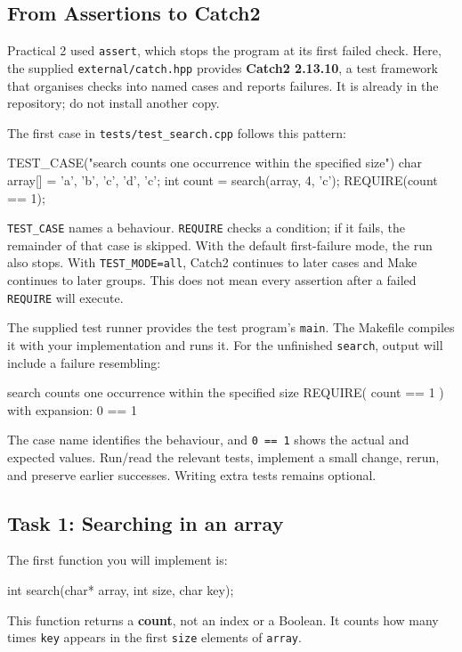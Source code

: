 \documentclass{csc2059practical}
\begin{document}
\subsection{From Assertions to Catch2}

Practical 2 used \texttt{assert}, which stops the program at its first failed check. Here, the supplied \texttt{external/catch.hpp} provides \textbf{Catch2 2.13.10}, a test framework that organises checks into named cases and reports failures. It is already in the repository; do not install another copy.

The first case in \texttt{tests/test\_search.cpp} follows this pattern:
\begin{cppcode}
TEST_CASE("search counts one occurrence within the specified size")
{
    char array[] = {'a', 'b', 'c', 'd', 'c'};
    int count = search(array, 4, 'c');
    REQUIRE(count == 1);
}
\end{cppcode}
\texttt{TEST\_CASE} names a behaviour. \texttt{REQUIRE} checks a condition; if it fails, the remainder of that case is skipped. With the default first-failure mode, the run also stops. With \texttt{TEST\_MODE=all}, Catch2 continues to later cases and Make continues to later groups. This does not mean every assertion after a failed \texttt{REQUIRE} will execute.

The supplied test runner provides the test program's \texttt{main}. The Makefile compiles it with your implementation and runs it. For the unfinished \texttt{search}, output will include a failure resembling:
\begin{terminal}
search counts one occurrence within the specified size
REQUIRE( count == 1 )
with expansion:
  0 == 1
\end{terminal}
The case name identifies the behaviour, and \texttt{0 == 1} shows the actual and expected values. Run/read the relevant tests, implement a small change, rerun, and preserve earlier successes. Writing extra tests remains optional.

\subsection{Task 1: Searching in an array}

The first function you will implement is:

\begin{cppcode}
int search(char* array,
           int size,
           char key);
\end{cppcode}

This function returns a \textbf{count}, not an index or a Boolean. It counts how many times \texttt{key} appears in the first \texttt{size} elements of \texttt{array}.
\end{document}
